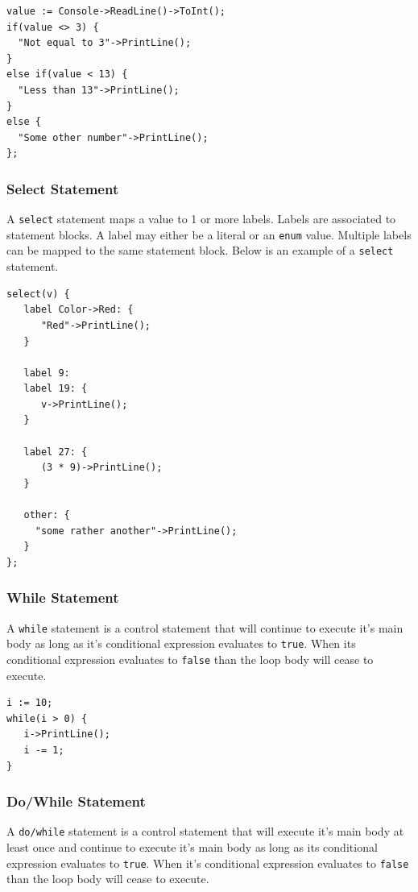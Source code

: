 \documentclass[11pt]{article}
\begin{document}
\begin{verbatim}
value := Console->ReadLine()->ToInt();
if(value <> 3) {
  "Not equal to 3"->PrintLine();
}
else if(value < 13) {
  "Less than 13"->PrintLine();
}
else {
  "Some other number"->PrintLine();
};
\end{verbatim}

\subsubsection{Select Statement}

A \texttt{select} statement maps a value to 1 or more labels.  Labels
are associated to statement blocks.  A label may either be a literal
or an \texttt{enum} value.  Multiple labels can be mapped to the same
statement block.  Below is an example of a \texttt{select} statement.

\begin{verbatim}
select(v) {
   label Color->Red: {
      "Red"->PrintLine();
   }

   label 9:
   label 19: {
      v->PrintLine();
   }

   label 27: {
      (3 * 9)->PrintLine();
   }
  
   other: {
     "some rather another"->PrintLine();
   }
};
\end{verbatim}

\subsubsection{While Statement}

A \texttt{while} statement is a control statement that will continue
to execute it's main body as long as it's conditional expression
evaluates to \texttt{true}.  When its conditional expression evaluates
to \texttt{false} than the loop body will cease to execute.

\begin{verbatim}
i := 10;
while(i > 0) {
   i->PrintLine();
   i -= 1;
}
\end{verbatim}

\subsubsection{Do/While Statement}

A \texttt{do/while} statement is a control statement that will execute
it's main body at least once and continue to execute it's main body as
long as its conditional expression evaluates to \texttt{true}.  When
it's conditional expression evaluates to \texttt{false} than the loop
body will cease to execute.
\end{document}
